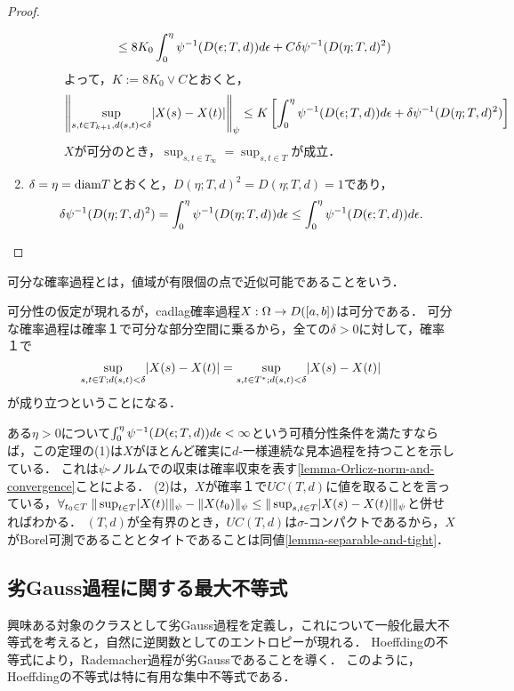 \documentclass[uplatex,dvipdfmx]{jsreport}
\begin{document}
\begin{proof}
\begin{enumerate}
\begin{description}
\begin{align*}
                &\le 8K_0\int^\eta_0\psi^{-1}(D(\epsilon;T,d))d\epsilon+C\delta\psi^{-1}(D(\eta;T,d)^2)
            \end{align*}
            よって，$K:=8K_0\lor C$とおくと，
            \[\left\|\sup_{s,t\in T_{k+1},d(s,t)<\delta}\lvert X(s)-X(t)\rvert\right\|_\psi\le K\left[\int^\eta_0\psi^{-1}(D(\epsilon;T,d))d\epsilon+\delta\psi^{-1}(D(\eta;T,d)^2)\right]\]
            $X$が可分のとき，$\sup_{s,t\in T_\infty}=\sup_{s,t\in T}$が成立．
        \end{description}
        \item $\delta=\eta=\mathrm{diam} T$とおくと，$D(\eta;T,d)^2=D(\eta;T,d)=1$であり，
        \[\delta\psi^{-1}(D(\eta;T,d)^2)=\int^\eta_0\psi^{-1}(D(\eta;T,d))d\epsilon\le\int^\eta_0\psi^{-1}(D(\epsilon;T,d))d\epsilon.\]
    \end{enumerate}
\end{proof}
\begin{remarks}[可分確率過程]
    可分な確率過程とは，値域が有限個の点で近似可能であることをいう．

    可分性の仮定が現れるが，cadlag確率過程$X:\Omega\to D([a,b])$は可分である．
    可分な確率過程は確率１で可分な部分空間に乗るから，全ての$\delta>0$に対して，確率１で
    \[\sup_{s,t\in T;d(s,t)<\delta}\lvert X(s)-X(t)\rvert=\sup_{s,t\in T^*;d(s,t)<\delta}\lvert X(s)-X(t)\rvert\]
    が成り立つということになる．

    ある$\eta>0$について$\int^\eta_0\psi^{-1}(D(\epsilon;T,d))d\epsilon<\infty$という可積分性条件を満たすならば，この定理の(1)は$X$がほとんど確実に$d$-一様連続な見本過程を持つことを示している．
    これは$\psi$-ノルムでの収束は確率収束を表す\ref{lemma-Orlicz-norm-and-convergence}ことによる．
    (2)は，$X$が確率１で$UC(T,d)$に値を取ることを言っている，$\forall_{t_0\in T}\;\|\sup_{t\in T}\lvert X(t)\rvert\|_\psi-\|X(t_0)\|_\psi\le\|\sup_{s,t\in T}\lvert X(s)-X(t)\rvert\|_\psi$と併せればわかる．
    $(T,d)$が全有界のとき，$UC(T,d)$は$\sigma$-コンパクトであるから，$X$がBorel可測であることとタイトであることは同値\ref{lemma-separable-and-tight}．
\end{remarks}


\subsection{劣Gauss過程に関する最大不等式}

\begin{tcolorbox}[colframe=ForestGreen, colback=ForestGreen!10!white,breakable,colbacktitle=ForestGreen!40!white,coltitle=black,fonttitle=\bfseries\sffamily,
title=]
    興味ある対象のクラスとして劣Gauss過程を定義し，これについて一般化最大不等式を考えると，自然に逆関数としてのエントロピーが現れる．
    Hoeffdingの不等式により，Rademacher過程が劣Gaussであることを導く．
    このように，Hoeffdingの不等式は特に有用な集中不等式である．
\end{tcolorbox}
\end{document}
